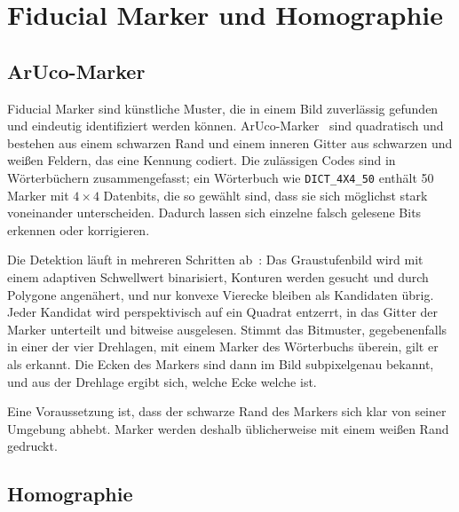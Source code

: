 \section{Fiducial Marker und Homographie}
\label{sec:aruco}

\subsection{ArUco-Marker}

Fiducial Marker sind künstliche Muster, die in einem Bild zuverlässig gefunden und eindeutig
identifiziert werden können. ArUco-Marker~\cite{garrido2014} sind quadratisch und bestehen
aus einem schwarzen Rand und einem inneren Gitter aus schwarzen und weißen Feldern, das eine
Kennung codiert. Die zulässigen Codes sind in Wörterbüchern zusammengefasst; ein Wörterbuch
wie \texttt{DICT\_4X4\_50} enthält 50 Marker mit $4 \times 4$ Datenbits, die so gewählt sind,
dass sie sich möglichst stark voneinander unterscheiden. Dadurch lassen sich einzelne falsch
gelesene Bits erkennen oder korrigieren.

Die Detektion läuft in mehreren Schritten ab~\cite{garrido2014}: Das Graustufenbild wird mit
einem adaptiven Schwellwert binarisiert, Konturen werden gesucht und durch Polygone
angenähert, und nur konvexe Vierecke bleiben als Kandidaten übrig. Jeder Kandidat wird
perspektivisch auf ein Quadrat entzerrt, in das Gitter der Marker unterteilt und bitweise
ausgelesen. Stimmt das Bitmuster, gegebenenfalls in einer der vier Drehlagen, mit einem Marker
des Wörterbuchs überein, gilt er als erkannt. Die Ecken des Markers sind dann im Bild
subpixelgenau bekannt, und aus der Drehlage ergibt sich, welche Ecke welche ist.

Eine Voraussetzung ist, dass der schwarze Rand des Markers sich klar von seiner Umgebung
abhebt. Marker werden deshalb üblicherweise mit einem weißen Rand gedruckt.

\subsection{Homographie}
\label{sec:homographie}

